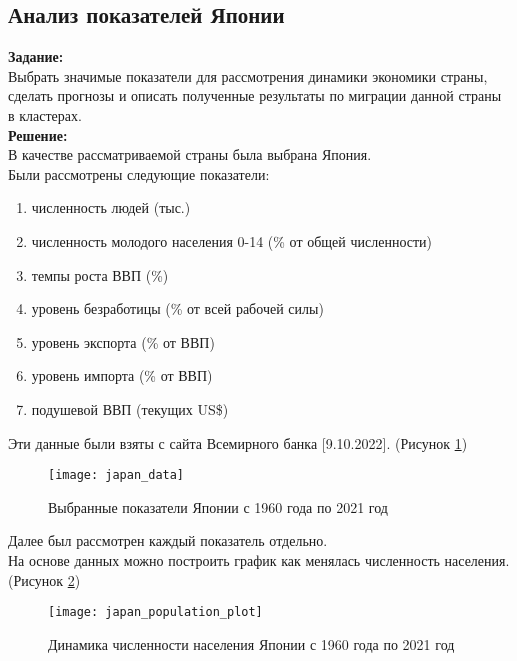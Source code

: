 \subsection*{Анализ показателей Японии}

\textbf{Задание:}\\
Выбрать значимые показатели для рассмотрения динамики экономики страны, сделать прогнозы и описать полученные результаты по миграции данной страны в кластерах.\\

\textbf{Решение:}\\
В качестве рассматриваемой страны была выбрана Япония.\\

Были рассмотрены следующие показатели:
\begin{enumerate}[topsep=0pt,itemsep=-1ex,partopsep=1ex,parsep=1ex]
	\item численность людей (тыс.)
	\item численность молодого населения 0-14 (\% от общей численности)
	\item темпы роста ВВП (\%)
	\item уровень безработицы (\% от всей рабочей силы)
	\item уровень экспорта (\% от ВВП)
	\item уровень импорта (\% от ВВП)
	\item подушевой ВВП (текущих US\$)\\
\end{enumerate}

Эти данные были взяты с сайта Всемирного банка [9.10.2022]. (Рисунок \ref{fig:japan_data})

\begin{figure}[h]
	\centering \texttt{[image: japan\_data]}
	\caption{Выбранные показатели Японии с 1960 года по 2021 год}
	\label{fig:japan_data}
\end{figure}

\newpage

Далее был рассмотрен каждый показатель отдельно.\\
На основе данных можно построить график как менялась численность населения. (Рисунок \ref{fig:japan_population_plot})

\begin{figure}[h]
	\centering \texttt{[image: japan\_population\_plot]}
	\caption{Динамика численности населения Японии с 1960 года по 2021 год}
	\label{fig:japan_population_plot}
\end{figure}

